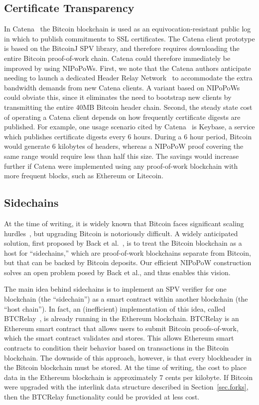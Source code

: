 \subsection{Certificate Transparency}
\label{sec.catena}
In Catena~\cite{catena} the Bitcoin blockchain is used as an equivocation-resistant public log in which to publish commitments to SSL certificates. The Catena client prototype is based on the BitcoinJ SPV library, and therefore requires downloading the entire Bitcoin proof-of-work chain.
Catena could therefore immediately be improved by using NIPoPoWs.
First, we note that the Catena authors anticipate needing to launch a dedicated Header Relay Network~\cite{catena} to accommodate the extra bandwidth demands from new Catena clients. A variant based on NIPoPoWs could obviate this, since it eliminates the need to bootstrap new clients by transmitting the entire 40MB Bitcoin header chain.
Second, the steady state cost of operating a Catena client depends on how frequently certificate digests are published. For example, one usage scenario cited by Catena~\cite{catena} is Keybase, a service which publishes certificate digests every 6 hours. During a 6 hour period, Bitcoin would generate 6 kilobytes of headers, whereas a NIPoPoW proof covering the same range would require less than half this size.
The  savings would increase further if Catena were implemented using any proof-of-work blockchain with more frequent blocks, such as Ethereum or Litecoin.

\subsection{Sidechains}
\label{sec.sidechains}
At the time of writing, it is widely known that Bitcoin faces significant scaling hurdles~\cite{onscaling}, but upgrading Bitcoin is notoriously difficult.
A widely anticipated solution, first proposed by Back et al.~\cite{sidechains}, is to treat the Bitcoin blockchain as a host for ``sidechains,'' which are proof-of-work blockchains separate from Bitcoin, but that can be backed by Bitcoin deposits. Our efficient NIPoPoW construction solves an open problem posed by Back et al., and thus enables this vision.

The main idea behind sidechains is to implement an SPV verifier for one blockchain (the ``sidechain'') as a smart contract within another blockchain (the ``host chain''). In fact, an (inefficient) implementation of this idea, called BTCRelay~\cite{ethereum}, is already running in the Ethereum blockchain. BTCRelay is an Ethereum smart contract that allows users to submit Bitcoin proofs-of-work, which the smart contract validates and stores. This allows Ethereum smart contracts to condition their behavior based on transactions in the Bitcoin blockchain.
 The downside of this approach, however, is that every blockheader in the Bitcoin blockchain must be stored. At the time of writing, the cost to place data in the Ethereum blockchain is approximately 7 cents per kilobyte. If Bitcoin were upgraded with the interlink data structure described in Section~\ref{sec.forks}, then the BTCRelay functionality could be provided at less cost.

